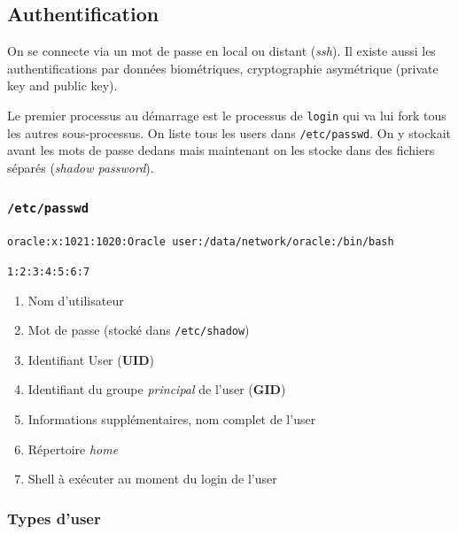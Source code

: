 \subsection{Authentification}\label{authentification}

On se connecte via un mot de passe en local ou distant (\emph{ssh}). Il
existe aussi les authentifications par données biométriques,
cryptographie asymétrique (private key and public key).

Le premier processus au démarrage est le processus de \texttt{login} qui
va lui fork tous les autres sous-processus. On liste tous les users dans
\texttt{/etc/passwd}. On y stockait avant les mots de passe dedans mais
maintenant on les stocke dans des fichiers séparés (\emph{shadow
password}).

\subsubsection{\texorpdfstring{\texttt{/etc/passwd}}{/etc/passwd}}\label{etcpasswd}

\texttt{oracle:x:1021:1020:Oracle\ user:/data/network/oracle:/bin/bash}

\texttt{1:2:3:4:5:6:7}

\begin{enumerate}
\def\labelenumi{\arabic{enumi}.}
\tightlist
\item
  Nom d'utilisateur
\item
  Mot de passe (stocké dans \texttt{/etc/shadow})
\item
  Identifiant User (\textbf{UID})
\item
  Identifiant du groupe \emph{principal} de l'user (\textbf{GID})
\item
  Informations supplémentaires, nom complet de l'user
\item
  Répertoire \emph{home}
\item
  Shell à exécuter au moment du login de l'user
\end{enumerate}

\subsubsection{Types d'user}\label{types-duser}


